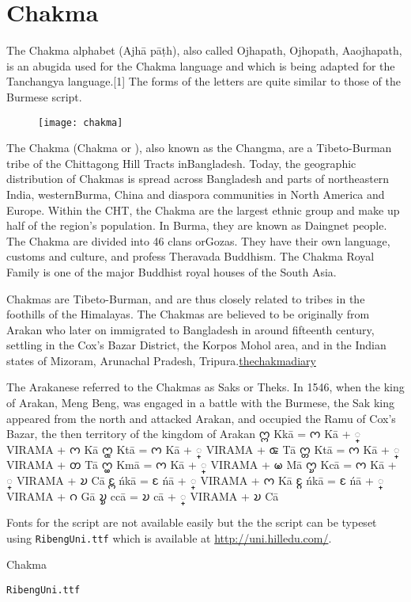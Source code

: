 \chapter{Chakma}
\label{s:chakma}

\newfontfamily{}

The Chakma alphabet (Ajhā pāṭh), also called Ojhapath, Ojhopath, Aaojhapath, is an abugida used for the Chakma language and which is being adapted for the Tanchangya language.[1] The forms of the letters are quite similar to those of the Burmese script.

\begin{figure}[htbp]
\texttt{[image: chakma]}
\end{figure}

The Chakma (Chakma or ), also known as the Changma, are a Tibeto-Burman tribe of the Chittagong Hill Tracts inBangladesh. Today, the geographic distribution of Chakmas is spread across Bangladesh and parts of northeastern India, westernBurma, China and diaspora communities in North America and Europe. Within the CHT, the Chakma are the largest ethnic group and make up half of the region's population. In Burma, they are known as Daingnet people. The Chakma are divided into 46 clans orGozas. They have their own language, customs and culture, and profess Theravada Buddhism. The Chakma Royal Family is one of the major Buddhist royal houses of the South Asia.

Chakmas are Tibeto-Burman, and are thus closely related to tribes in the foothills of the Himalayas. The Chakmas are believed to be originally from Arakan who later on immigrated to Bangladesh in around fifteenth century, settling in the Cox's Bazar District, the Korpos Mohol area, and in the Indian states of Mizoram, Arunachal Pradesh, Tripura.\href{http://thechakmadiary.weebly.com/about.html}{thechakmadiary}

The Arakanese referred to the Chakmas as Saks or Theks. In 1546, when the king of Arakan, Meng Beng, was engaged in a battle with the Burmese, the Sak king appeared from the north and attacked Arakan, and occupied the Ramu of Cox's Bazar, the then territory of the kingdom of Arakan
\bgroup
\obeylines
\chakma
𑄇𑄳𑄇 Kkā = 𑄇 Kā + 𑄳 VIRAMA + 𑄇 Kā
𑄇𑄳𑄑 Ktā = 𑄇 Kā + 𑄳 VIRAMA + 𑄑 Tā
𑄇𑄳𑄖 Ktā = 𑄇 Kā + 𑄳 VIRAMA + 𑄖 Tā
𑄇𑄳𑄟 Kmā = 𑄇 Kā + 𑄳 VIRAMA + 𑄟 Mā
𑄇𑄳𑄌 Kcā = 𑄇 Kā + 𑄳 VIRAMA + 𑄌 Cā
𑄋𑄳𑄇 ńkā = 𑄋 ńā + 𑄳 VIRAMA + 𑄇 Kā
𑄋𑄳𑄉 ńkā = 𑄋 ńā + 𑄳 VIRAMA + 𑄉 Gā
𑄌𑄳𑄌 ccā = 𑄌 cā + 𑄳 VIRAMA + 𑄌 Cā

\egroup

Fonts for the script are not available easily but the
the script can be typeset using \texttt{RibengUni.ttf} which is available at \url{http://uni.hilledu.com/}. 

\begin{scriptexample}[]{Chakma}

\texttt{RibengUni.ttf}
\end{scriptexample}


